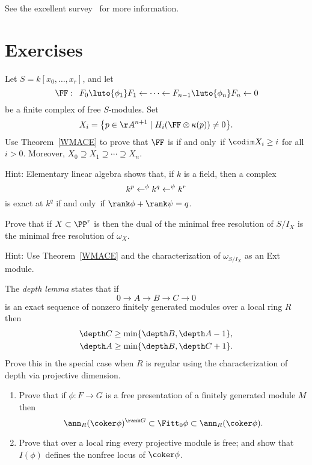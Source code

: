 See the excellent survey~\cite{Farkas-progress-on-syzygies}
for more information.


\section{Exercises}

\begin{exercise}\label{WMACE corollary}
Let $S = k[x_0,\dots, x_r]$, and let
$$
\FF:\quad  
F_0\luto{\phi_1}F_1 \leftarrow \cdots \leftarrow F_{n-1}\luto{\phi_n} F_n\leftarrow 0
$$
be a finite complex of free $S$-modules. Set
$$
X_i =\big\{p\in \AA^{n+1} \mid  H_i(\FF \otimes \kappa(p)) \neq 0 \big\}.
$$
Use Theorem~\ref{WMACE} to prove that $\FF$ is 
%
if and only~if
$
\codim X_i \geq i
$
for all $i>0$. Moreover, $X_{0}\supseteq X_{1}\supseteq \cdots \supseteq
X_{n}$.

Hint: Elementary linear algebra shows that, if $k$ is a field, then a
complex $$k^p \lTo^{\phi} k^q \lTo^\psi k^r$$ is exact at $k^q$ if and
only~if $\rank \phi +\rank \psi = q$.
\end{exercise}

\begin{exercise}
Prove that if $X\subset \PP^r$ is 
%
then
the dual of the minimal free resolution of $S/I_X$
is the minimal free resolution of $\omega_X$.

Hint: Use Theorem~\ref{WMACE}
and the characterization of $\omega_{S/I_X}$
as an Ext module.
\end{exercise}

\begin{exercise}
The \emph{depth lemma} states that if
%
$$
0\to A\to B\to C \to 0
$$
is an exact sequence of nonzero finitely generated modules over a local
ring $R$ then
$$
\begin{aligned}
\depth C &\geq \min\{\depth B, \depth A-1\},\\
\depth A & \geq \min\{\depth B, \depth C +1\}.
\end{aligned}
$$
Prove this in the special case when $R$ is regular using the
characterization of depth
via projective dimension.
\end{exercise}

\begin{exercise}
\begin{enumerate}
\item Prove that if $\phi: F\to G$ is a free presentation of a finitely
generated module $M$
then
$$
\ann_{R}(\coker \phi)^{\rank G}\subset \Fitt_{0}\phi \subset
\ann_{R}(\coker \phi).
$$
\item Prove that over a local ring every projective module is free;
and show that
$I(\phi)$ defines the nonfree locus of $\coker \phi$.
\end{enumerate}
\end{exercise}

